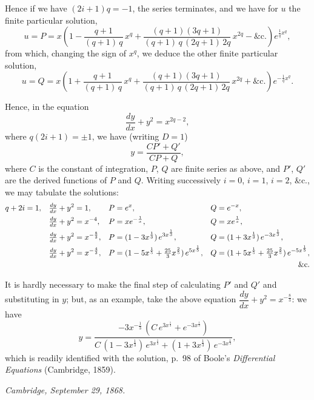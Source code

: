 \documentclass[11pt,a4paper]{article}
\begin{document}
Hence if we have $(2i+1)q = -1$, the series terminates, and we have for $u$
the finite particular solution,
\[
u = P = x\left(1 - \frac{q+1}{(q+1)\,q}\,x^q
+ \frac{(q+1)(3q+1)}{(q+1)\,q\,(2q+1)\,2q}\,x^{2q}
- \&\text{c.}\right) e^{\frac{1}{q}x^q},
\]
from which, changing the sign of $x^q$, we deduce the other finite particular
solution,
\[
u = Q = x\left(1 + \frac{q+1}{(q+1)\,q}\,x^q
+ \frac{(q+1)(3q+1)}{(q+1)\,q\,(2q+1)\,2q}\,x^{2q}
+ \&\text{c.}\right) e^{-\frac{1}{q}x^q}.
\]

Hence, in the equation
\[
\frac{dy}{dx} + y^2 = x^{2q-2},
\]
where $q(2i+1) = \pm 1$, we have (writing $D=1$)
\[
y = \frac{CP' + Q'}{CP + Q},
\]
where $C$ is the constant of integration, $P$, $Q$ are finite series as above,
and $P'$, $Q'$ are the derived functions of $P$ and $Q$.  Writing successively
$i = 0$, $i = 1$, $i = 2$, \&c., we may tabulate the solutions:
\begin{align*}
q + 2i &= 1, & \tfrac{dy}{dx} + y^2 &= 1, & P &= e^x, & Q &= e^{-x}, \\
&     & \tfrac{dy}{dx} + y^2 &= x^{-4}, & P &= x e^{-\frac{1}{x}}, & Q &= x e^{\frac{1}{x}}, \\
&     & \tfrac{dy}{dx} + y^2 &= x^{-\frac{8}{3}}, & P &= (1 - 3 x^{\frac{1}{3}})\,e^{3 x^{\frac{1}{3}}}, & Q &= (1 + 3 x^{\frac{1}{3}})\,e^{-3 x^{\frac{1}{3}}}, \\
&     & \tfrac{dy}{dx} + y^2 &= x^{-\frac{4}{3}}, & P &= (1 - 5 x^{\frac{1}{5}} + \tfrac{25}{3}x^{\frac{2}{5}})\,e^{5 x^{\frac{1}{5}}}, & Q &= (1 + 5 x^{\frac{1}{5}} + \tfrac{25}{3}x^{\frac{2}{5}})\,e^{-5 x^{\frac{1}{5}}}, \\
& \multicolumn{7}{r}{\&\text{c.}}
\end{align*}

It is hardly necessary to make the final step of calculating $P'$ and $Q'$ and
substituting in $y$; but, as an example, take the above equation
$\dfrac{dy}{dx} + y^2 = x^{-\frac{8}{3}}$: we have
\[
y = \frac{-3 x^{-\frac{1}{3}}\,(C\,e^{3 x^{\frac{1}{3}}} + e^{-3 x^{\frac{1}{3}}})}
{C\,(1 - 3 x^{\frac{1}{3}})\,e^{3 x^{\frac{1}{3}}} + (1 + 3 x^{\frac{1}{3}})\,e^{-3 x^{\frac{1}{3}}}},
\]
which is readily identified with the solution, p.~98 of Boole's
\textit{Differential Equations} (Cambridge, 1859).

\begin{flushright}
\textit{Cambridge, September 29, 1868.}
\end{flushright}

\clearpage

\end{document}
